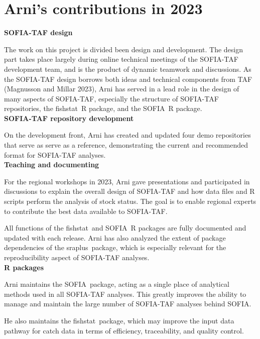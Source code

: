 \documentclass[12pt]{article}
\newcommand\fishstat{{\sf fishstat}}
\newcommand\SOFIA{{\sf SOFIA}}
\newcommand\sraplus{{\sf sraplus}}
\begin{document}
\normalsize

\newpage

\appendix

\section{Arni's contributions in 2023}

\textbf{SOFIA-TAF design}

The work on this project is divided been design and development. The design part
takes place largely during online technical meetings of the SOFIA-TAF
development team, and is the product of dynamic teamwork and discussions. As the
SOFIA-TAF design borrows both ideas and technical components from TAF (Magnusson
and Millar 2023), Arni has served in a lead role in the design of many aspects
of SOFIA-TAF, especially the structure of SOFIA-TAF repositories, the \fishstat\
R package, and the \SOFIA\ R package.\\[-2ex]

\textbf{SOFIA-TAF repository development}

On the development front, Arni has created and updated four demo repositories
that serve as serve as a reference, demonstrating the current and
recommended format for SOFIA-TAF analyses.\\[-2ex]

\textbf{Teaching and documenting}

For the regional workshops in 2023, Arni gave presentations and participated in
discussions to explain the overall design of SOFIA-TAF and how data files and R
scripts perform the analysis of stock status. The goal is to enable regional
experts to contribute the best data available to SOFIA-TAF.

All functions of the \fishstat\ and \SOFIA\ R packages are fully documented and
updated with each release. Arni has also analyzed the extent of package
dependencies of the \sraplus\ package, which is especially relevant for the
reproducibility aspect of SOFIA-TAF analyses.\\[-2ex]

\textbf{R packages}

Arni maintains the \SOFIA\ package, acting as a single place of analytical
methods used in all SOFIA-TAF analyses. This greatly improves the ability to
manage and maintain the large number of SOFIA-TAF analyses behind SOFIA.

He also maintains the \fishstat\ package, which may improve the input data
pathway for catch data in terms of efficiency, traceability, and quality
control.\\[-2ex]
\end{document}
